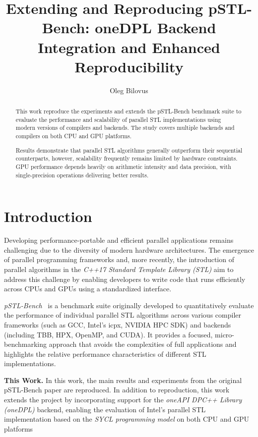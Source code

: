 \documentclass[sigconf]{acmart}
\title{Extending and Reproducing pSTL-Bench: oneDPL Backend Integration and Enhanced Reproducibility}
\author{Oleg Bilovus}
\affiliation{
  \institution{Department of Computer Science, University of Salerno}
  \city{Fisciano (SA)}
  \country{Italy}
}
\newcommand{\mypar}[1]{{\bf #1.}}
\begin{document}
\begin{abstract}
      This work reproduce the experiments and extends the pSTL-Bench benchmark suite to evaluate the
      performance and scalability of parallel STL implementations using modern versions of compilers and backends.
      The study covers multiple backends and compilers on both CPU and GPU platforms.

      Results demonstrate that parallel STL algorithms generally outperform their
      sequential counterparts, however, scalability frequently remains limited by
      hardware constraints. GPU performance depends heavily on arithmetic intensity
      and data precision, with single-precision operations delivering better results.
\end{abstract}

\maketitle

\section{Introduction}\label{sec:intro}
Developing performance-portable and efficient parallel applications remains
challenging due to the diversity of modern hardware architectures. The
emergence of parallel programming frameworks and, more recently, the
introduction of parallel algorithms in the \textit{C++17 Standard Template
      Library (STL)} aim to address this challenge by enabling developers to write
code that runs efficiently across CPUs and GPUs using a standardized interface.

\textit{pSTL-Bench}~\cite{pSTL-Bench} is a benchmark suite originally developed to
quantitatively evaluate the performance of individual parallel STL algorithms
across various compiler frameworks (such as GCC, Intel's icpx, NVIDIA HPC SDK)
and backends (including TBB, HPX, OpenMP, and CUDA). It provides a focused,
micro-benchmarking approach that avoids the complexities of full applications
and highlights the relative performance characteristics of different STL
implementations.

\mypar{This Work} In this work, the main results and experiments from the original pSTL-Bench
paper are reproduced. In addition to reproduction, this work extends the project by
incorporating support for the \textit{oneAPI DPC++ Library (oneDPL)} backend,
enabling the evaluation of Intel’s parallel STL implementation based on the
\textit{SYCL programming model} on both CPU and GPU platforms
\end{document}
